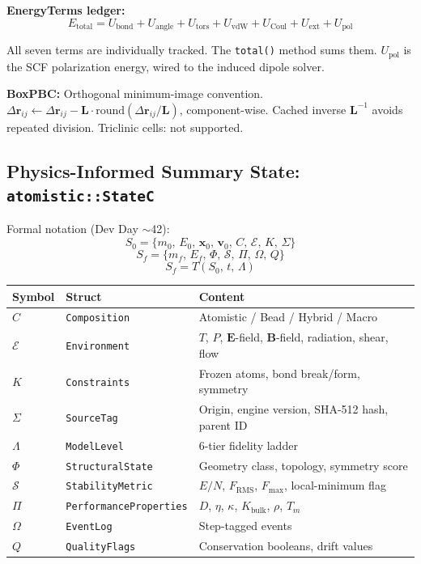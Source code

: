 \documentclass[11pt,a4paper]{article}
\begin{document}
\noindent\textbf{EnergyTerms ledger:}
\[
E_{\mathrm{total}} = U_{\mathrm{bond}} + U_{\mathrm{angle}} + U_{\mathrm{tors}}
                   + U_{\mathrm{vdW}} + U_{\mathrm{Coul}} + U_{\mathrm{ext}} + U_{\mathrm{pol}}
\]

All seven terms are individually tracked. The \texttt{total()} method sums them.
$U_{\mathrm{pol}}$ is the SCF polarization energy, wired to the induced dipole solver.

\noindent\textbf{BoxPBC:} Orthogonal minimum-image convention.
$\Delta\mathbf{r}_{ij} \leftarrow \Delta\mathbf{r}_{ij} - \mathbf{L} \cdot \mathrm{round}(\Delta\mathbf{r}_{ij}/\mathbf{L})$,
component-wise. Cached inverse $\mathbf{L}^{-1}$ avoids repeated division.
Triclinic cells: not supported.

\subsection{Physics-Informed Summary State: \texttt{atomistic::StateC}}

Formal notation (Dev Day $\sim$42):
\[
S_0 = \{m_0,\, E_0,\, \mathbf{x}_0,\, \mathbf{v}_0,\, C,\, \mathcal{E},\, K,\, \Sigma\}
\]
\[
S_f = \{m_f,\, E_f,\, \Phi,\, \mathcal{S},\, \Pi,\, \Omega,\, Q\}
\]
\[
S_f = T(S_0,\, t,\, \Lambda)
\]

\begin{center}
\begin{tabular}{lll}
\toprule
Symbol & Struct & Content \\
\midrule
$C$        & \texttt{Composition}         & Atomistic / Bead / Hybrid / Macro \\
$\mathcal{E}$ & \texttt{Environment}      & $T$, $P$, $\mathbf{E}$-field, $\mathbf{B}$-field, radiation, shear, flow \\
$K$        & \texttt{Constraints}         & Frozen atoms, bond break/form, symmetry \\
$\Sigma$   & \texttt{SourceTag}           & Origin, engine version, SHA-512 hash, parent ID \\
$\Lambda$  & \texttt{ModelLevel}          & 6-tier fidelity ladder \\
$\Phi$     & \texttt{StructuralState}     & Geometry class, topology, symmetry score \\
$\mathcal{S}$ & \texttt{StabilityMetric}  & $E/N$, $F_{\mathrm{RMS}}$, $F_{\mathrm{max}}$, local-minimum flag \\
$\Pi$      & \texttt{PerformanceProperties} & $D$, $\eta$, $\kappa$, $K_{\mathrm{bulk}}$, $\rho$, $T_m$ \\
$\Omega$   & \texttt{EventLog}            & Step-tagged events \\
$Q$        & \texttt{QualityFlags}        & Conservation booleans, drift values \\
\bottomrule
\end{tabular}
\end{center}
\end{document}
